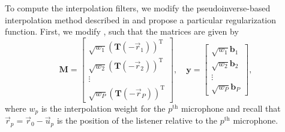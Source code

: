 To compute the interpolation filters, we modify the pseudoinverse-based interpolation method described in  and propose a particular regularization function.
First, we modify , such that the matrices are given by
\begin{equation}\label{eq:08_Proposed_Method:Linear_System_Matrices}
\mathbf{M} = 
    \left[ \begin{array}{c}
    \sqrt{w_1} \left( \mathbf{T}(-\vec{r}_1) \right)^\text{T} \\
    \sqrt{w_2} \left( \mathbf{T}(-\vec{r}_2) \right)^\text{T} \\
    \vdots\\
    \sqrt{w_P} \left( \mathbf{T}(-\vec{r}_P) \right)^\text{T}
    \end{array} \right]
,\quad
\mathbf{y} = 
    \left[ \begin{array}{c}
    \sqrt{w_1} \mathbf{b}_1\\
    \sqrt{w_2} \mathbf{b}_2\\
    \vdots\\
    \sqrt{w_P} \mathbf{b}_P
    \end{array} \right],
\end{equation}
where $w_p$ is the interpolation weight for the $p^\textrm{th}$ microphone and recall that $\vec{r}_p = \vec{r}_0 - \vec{u}_p$ is the position of the listener relative to the $p^\textrm{th}$ microphone.

